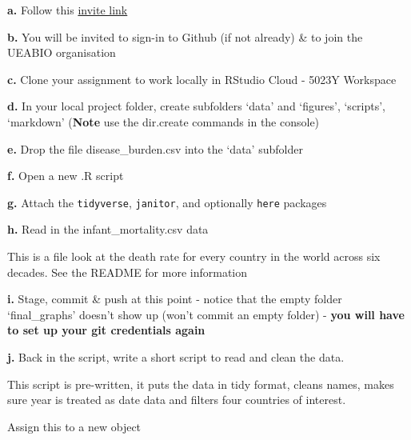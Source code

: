 \documentclass[
]{book}
\begin{document}
\textbf{a.} Follow this \href{https://classroom.github.com/a/QFt76-i2}{invite link}

\textbf{b.} You will be invited to sign-in to Github (if not already) \& to join the UEABIO organisation

\textbf{c.} Clone your assignment to work locally in RStudio Cloud - 5023Y Workspace

\textbf{d.} In your local project folder, create subfolders `data' and `figures', `scripts', `markdown' (\textbf{Note} use the dir.create commands in the console)

\textbf{e.} Drop the file disease\_burden.csv into the `data' subfolder

\textbf{f.} Open a new .R script

\textbf{g.} Attach the \texttt{tidyverse}, \texttt{janitor}, and optionally \texttt{here} packages

\textbf{h.} Read in the infant\_mortality.csv data

This is a file look at the death rate for every country in the world across six decades. See the README for more information

\textbf{i.} Stage, commit \& push at this point - notice that the empty folder `final\_graphs' doesn't show up (won't commit an empty folder) - \textbf{you will have to set up your git credentials again}

\textbf{j.} Back in the script, write a short script to read and clean the data.

This script is pre-written, it puts the data in tidy format, cleans names, makes sure year is treated as date data and filters four countries of interest.

Assign this to a new object
\end{document}
